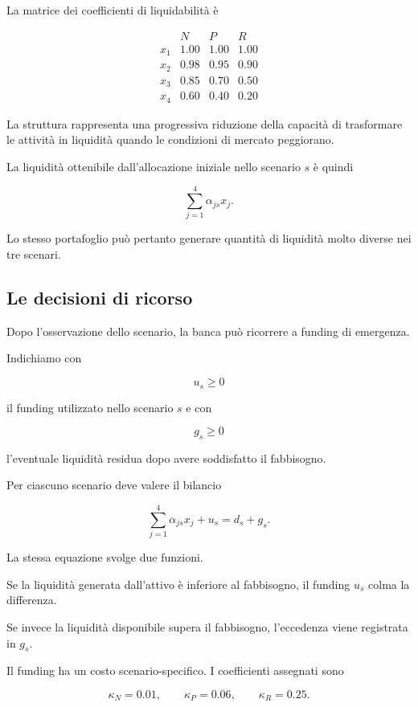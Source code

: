 La matrice dei coefficienti di liquidabilit\`a \`e

\[
\begin{array}{c|ccc}
 & N & P & R\\
\hline
x_1 & 1.00 & 1.00 & 1.00\\
x_2 & 0.98 & 0.95 & 0.90\\
x_3 & 0.85 & 0.70 & 0.50\\
x_4 & 0.60 & 0.40 & 0.20
\end{array}
\]

La struttura rappresenta una progressiva riduzione della capacit\`a di
trasformare le attivit\`a in liquidit\`a quando le condizioni di mercato
peggiorano.

La liquidit\`a ottenibile dall'allocazione iniziale nello scenario \(s\)
\`e quindi

\[
\sum_{j=1}^{4}\alpha_{js}x_j.
\]

Lo stesso portafoglio pu\`o pertanto generare quantit\`a di liquidit\`a molto
diverse nei tre scenari.

\subsection{Le decisioni di ricorso}

Dopo l'osservazione dello scenario, la banca pu\`o ricorrere a funding di
emergenza.

Indichiamo con

\[
u_s\geq 0
\]

\noindent il funding utilizzato nello scenario \(s\) e con

\[
g_s\geq 0
\]

\noindent l'eventuale liquidit\`a residua dopo avere soddisfatto il
fabbisogno.

Per ciascuno scenario deve valere il bilancio

\[
\sum_{j=1}^{4}\alpha_{js}x_j
+
u_s
=
d_s+g_s.
\]

La stessa equazione svolge due funzioni.

Se la liquidit\`a generata dall'attivo \`e inferiore al fabbisogno, il
funding \(u_s\) colma la differenza.

Se invece la liquidit\`a disponibile supera il fabbisogno, l'eccedenza viene
registrata in \(g_s\).

Il funding ha un costo scenario-specifico. I coefficienti assegnati sono

\[
\kappa_N=0.01,
\qquad
\kappa_P=0.06,
\qquad
\kappa_R=0.25.
\]

